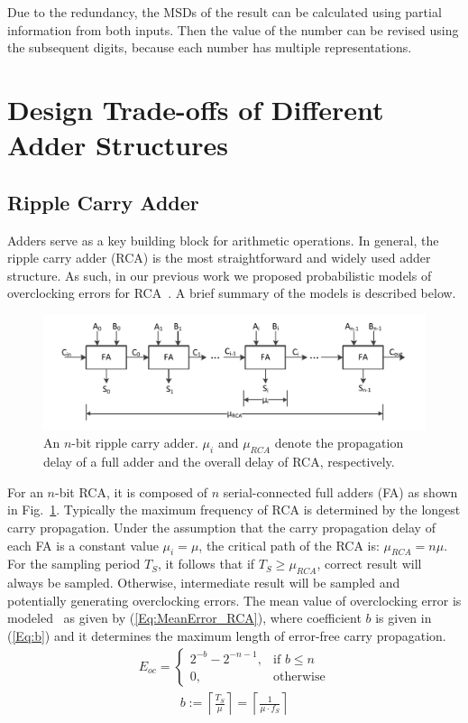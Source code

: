 \documentclass[10pt, conference, compsocconf]{IEEEtran}
\begin{document}
Due to the redundancy, the MSDs of the result can be calculated using partial information from both inputs. Then the value of the number can be revised using the subsequent digits, because each number has multiple representations.

\section{Design Trade-offs of Different Adder Structures}\label{sec:diff_adder}
\subsection{Ripple Carry Adder}\label{subsec:rca}
Adders serve as a key building block for arithmetic operations. In general, the ripple carry adder (RCA) is the most straightforward and widely used adder structure. As such, in our previous work we proposed probabilistic models of overclocking errors for RCA~\cite{SKfccm13}. A brief summary of the models is described below.
%
\begin{figure}[tbp]
  \centering
  \includegraphics[width=.5\textwidth]{./figures/RCA.pdf}
  \vspace{-4ex}
  \caption{An $n$-bit ripple carry adder. $\mu_i$ and $\mu_{RCA}$ denote the propagation delay of a full adder and the overall delay of RCA, respectively.}
  \vspace{-2ex}
  \label{Fig:rca}
\end{figure}

For an $n$-bit RCA, it is composed of $n$ serial-connected full adders (FA) as shown in Fig.~\ref{Fig:rca}. Typically the maximum frequency of RCA is determined by the longest carry propagation. Under the assumption that the carry propagation delay of each FA is a constant value $\mu_i=\mu$, the critical path of the RCA is: $\mu_{RCA}=n\mu$. For the sampling period $T_S$, it follows that if $T_S\geqslant\mu_{RCA}$, correct result will always be sampled. Otherwise, intermediate result will be sampled and potentially generating overclocking errors. The mean value of overclocking error is modeled~\cite{SKfccm13} as given by (\ref{Eq:MeanError_RCA}), where coefficient $b$ is given in (\ref{Eq:b}) and it determines the maximum length of error-free carry propagation.
%
\begin{eqnarray}\label{Eq:MeanError_RCA}
    E_{oc}=\left\{
        \begin{matrix}
            2^{-b}-2^{-n-1}, & \textrm{if $b\leq n$}\\
            0, & \textrm{otherwise}
        \end{matrix}
        \right.
\end{eqnarray}
\vspace{-1.5ex}
%
\begin{eqnarray}\label{Eq:b}
    b:=\left\lceil \frac{T_S}{\mu} \right\rceil=\left\lceil \frac{1}{\mu\cdot f_S}\right\rceil
\end{eqnarray}
\vspace{-1ex}
\normalsize
\end{document}
